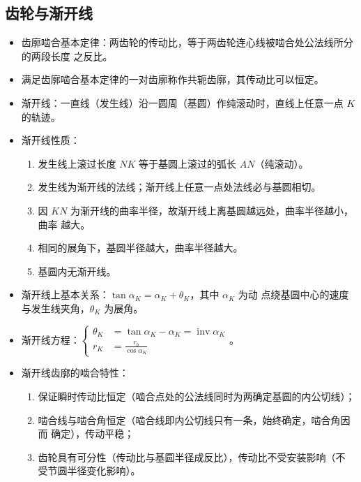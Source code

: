\documentclass[12pt,a4paper]{article}
\newcommand{\tightlist}{\setlength{\parskip}{0pt}\setlength{\itemsep}{0pt}}
\newcommand{\hint}[1]{\textsf{（#1）}}
\DeclareMathOperator{\inv}{inv}
\begin{document}
\subsection{齿轮与渐开线}
\begin{itemize}\tightlist
    \item 齿廓啮合基本定律：两齿轮的传动比，等于两齿轮连心线被啮合处公法线所分的两段长度
    之反比。
    \item 满足齿廓啮合基本定律的一对齿廓称作共轭齿廓，其传动比可以恒定。
    \item 渐开线：一直线\hint{发生线}沿一圆周\hint{基圆}作纯滚动时，直线上任意一点 $K$ 的轨迹。
    \item 渐开线性质：
    \begin{enumerate}\tightlist
        \item 发生线上滚过长度 $NK$ 等于基圆上滚过的弧长 $AN$\hint{纯滚动}。
        \item 发生线为渐开线的法线；渐开线上任意一点处法线必与基圆相切。
        \item 因 $KN$ 为渐开线的曲率半径，故渐开线上离基圆越远处，曲率半径越小，曲率
        越大。
        \item 相同的展角下，基圆半径越大，曲率半径越大。
        \item 基圆内无渐开线。
    \end{enumerate}
    \item 渐开线上基本关系：$\tan\alpha_K=\alpha_K+\theta_K$，其中 $\alpha_K$ 为动
    点绕基圆中心的速度与发生线夹角，$\theta_K$ 为展角。
    \item 渐开线方程：$\begin{cases}\theta_K&=\tan\alpha_K-\alpha_K=\inv\alpha_K\\
    r_K&=\frac{r_b}{\cos\alpha_K}\end{cases}$。
    \item 渐开线齿廓的啮合特性：
    \begin{enumerate}\tightlist
        \item 保证瞬时传动比恒定\hint{啮合点处的公法线同时为两确定基圆的内公切线}；
        \item 啮合线与啮合角恒定\hint{啮合线即内公切线只有一条，始终确定，啮合角因而
        确定}，传动平稳；
        \item 齿轮具有可分性\hint{传动比与基圆半径成反比}，传动比不受安装影响\hint{不
        受节圆半径变化影响}。
    \end{enumerate}
\end{itemize}
\end{document}
